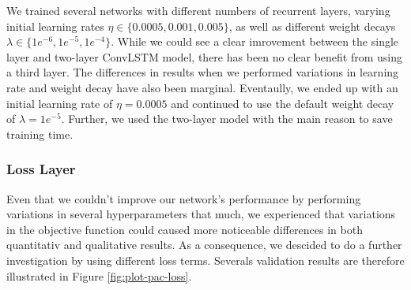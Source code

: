 We trained several networks with different numbers of recurrent layers, varying initial learning rates $\eta \in \{0.0005, 0.001, 0.005\}$, as well as different weight decays $\lambda \in \{1e^{-6}, 1e^{-5}, 1e^{-4}\} $. While we could see a clear imrovement between the single layer and two-layer ConvLSTM model, there has been no clear benefit from using a third layer. The differences in results when we performed variations in learning rate and weight decay have also been marginal. Eventaully, we ended up with an initial learning rate of $\eta = 0.0005 $ and continued to use the default weight decay of $\lambda = 1e^{-5}$. Further, we used the two-layer model with the main reason to save training time.


\subsubsection*{Loss Layer}

Even that we couldn't improve our network's performance by performing variations in several hyperparameters that much, we experienced that variations in the objective function could caused more noticeable differences in both quantitativ and qualitative results. As a consequence, we descided to do a further investigation by using different loss terms. Severals validation results are therefore illustrated in Figure \ref{fig:plot-pac-loss}. 

